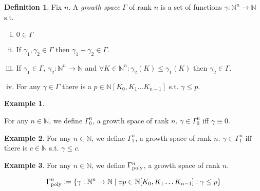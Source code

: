 \documentclass[11pt]{article}
\numberwithin{equation}{section}
\theoremstyle{definition}
\newtheorem{definition}{Definition}[section]
\newtheorem{example}{Example}[section]
\theoremstyle{plain}
\newcommand{\Nats}{\mathbb{N}}
\newcommand{\NatPoly}{\Nats[K_0, K_1 \ldots K_{n-1}]}
\newcommand{\NatFun}{\Nats^n \rightarrow}
\newcommand{\GammaPoly}{\Gamma_{\textnormal{poly}}}
\begin{document}
\begin{samepage}
\begin{definition}
\label{def:grow}
Fix $n$. A \emph{growth space} $\Gamma$ of rank $n$ is a set of functions ${\gamma: \NatFun \Nats}$ s.t.

\begin{enumerate}[(i)]

\item\label{con:def__grow__zero} $0 \in \Gamma$

\item\label{con:def__grow__add} If $\gamma_1, \gamma_2 \in \Gamma$ then $\gamma_1 + \gamma_2 \in \Gamma$.

\item\label{con:def__grow__ineq} If $\gamma_1 \in \Gamma$, $\gamma_2: \NatFun \Nats$ and $\forall K \in \Nats^n: \gamma_2(K) \leq \gamma_1(K)$ then $\gamma_2 \in \Gamma$.

\item\label{con:def__grow__poly} For any $\gamma \in \Gamma$ there is a $p \in \NatPoly$ s.t. $\gamma \leq p$.

\end{enumerate}

\end{definition}
\end{samepage}

\begin{example}
\label{exm:gamma_zero}

For any $n \in \Nats$, we define $\Gamma_0^n$, a growth space of rank $n$. $\gamma \in \Gamma_0^n$ iff $\gamma \equiv 0$.

\end{example}

\begin{samepage}
\begin{example}

For any $n \in \Nats$, we define $\Gamma_1^n$, a growth space of rank $n$. $\gamma \in \Gamma_1^n$ iff there is ${c \in \Nats}$ s.t. ${\gamma \leq c}$.

\end{example}
\end{samepage}

\begin{example}

For any $n \in \Nats$, we define $\GammaPoly^n$, a growth space of rank $n$. 

\[\GammaPoly^n := \{\gamma: \NatFun \Nats \mid \exists p \in \NatPoly: \gamma \leq p\}\]

\end{example}
\end{document}
